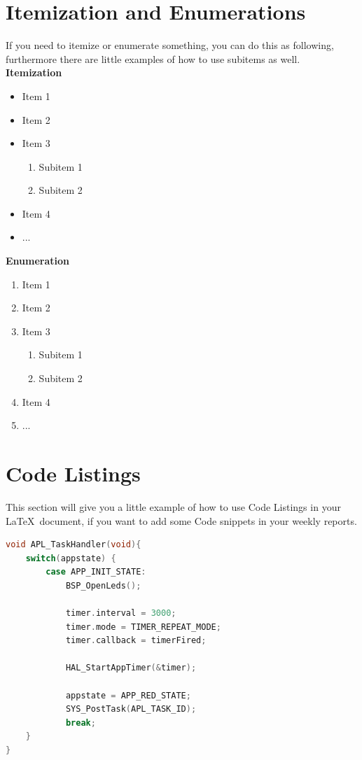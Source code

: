 \documentclass[]{article}
\begin{document}
\section{Itemization and Enumerations}
If you need to itemize or enumerate something, you can do this as following, furthermore there are little examples of how to use subitems as well. \\ %

\textbf{Itemization}
\begin{itemize}
	\item Item 1
	\item Item 2
	\item Item 3
		\begin{enumerate}
			\item Subitem 1
			\item Subitem 2
		\end{enumerate}
	\item Item 4
	\item ... \\
\end{itemize}

\textbf{Enumeration}
\begin{enumerate}
	\item Item 1
	\item Item 2
	\item Item 3
		\begin{enumerate}
			\item Subitem 1
			\item Subitem 2
		\end{enumerate}
	\item Item 4
	\item ...
\end{enumerate}

\section{Code Listings}
This section will give you a little example of how to use Code Listings in your \LaTeX\ document, if you want to add some Code snippets in your weekly reports.

\begin{lstlisting}[language=C,frame=single, caption = Taskhandler of Router, label = task_router] 
void APL_TaskHandler(void){
	switch(appstate) {
		case APP_INIT_STATE:
			BSP_OpenLeds();

			timer.interval = 3000;
			timer.mode = TIMER_REPEAT_MODE;
			timer.callback = timerFired;

			HAL_StartAppTimer(&timer);

			appstate = APP_RED_STATE;
			SYS_PostTask(APL_TASK_ID);
			break; 
	}
}

\end{lstlisting} 
\end{document}
